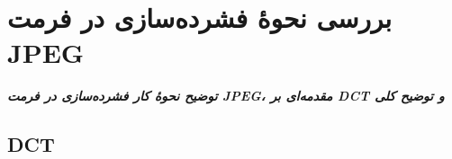 \chapter{بررسی نحوهٔ فشرده‌سازی در فرمت JPEG}
\noindent
\textbf{
	\textit{
        توضیح نحوهٔ کار فشرده‌سازی در فرمت JPEG، 
        مقدمه‌ای بر DCT و 
        توضیح کلی 
	}
}
\pagebreak

\section{DCT}
